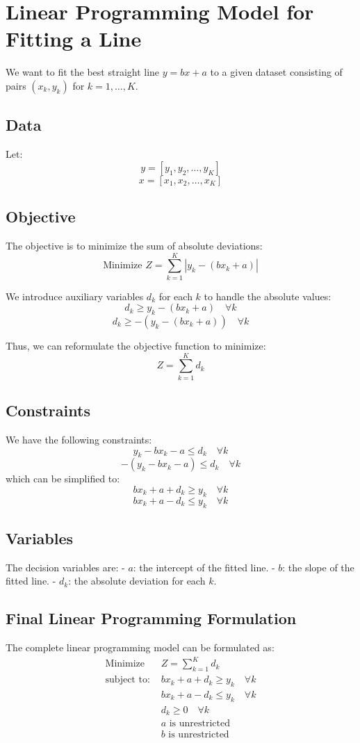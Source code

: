 \documentclass{article}
\begin{document}
\section*{Linear Programming Model for Fitting a Line}

We want to fit the best straight line \( y = bx + a \) to a given dataset consisting of pairs \( (x_k, y_k) \) for \( k = 1, \ldots, K \).

\subsection*{Data}
Let:
\[
y = [y_{1}, y_{2}, \ldots, y_{K}]
\]
\[
x = [x_{1}, x_{2}, \ldots, x_{K}]
\]

\subsection*{Objective}
The objective is to minimize the sum of absolute deviations:
\[
\text{Minimize } Z = \sum_{k=1}^{K} |y_{k} - (bx_{k} + a)|
\]

We introduce auxiliary variables \( d_k \) for each \( k \) to handle the absolute values:
\[
d_k \geq y_{k} - (bx_{k} + a) \quad \forall k
\]
\[
d_k \geq -(y_{k} - (bx_{k} + a)) \quad \forall k
\]

Thus, we can reformulate the objective function to minimize:
\[
Z = \sum_{k=1}^{K} d_k
\]

\subsection*{Constraints}
We have the following constraints:
\[
y_k - bx_k - a \leq d_k \quad \forall k
\]
\[
-(y_k - bx_k - a) \leq d_k \quad \forall k
\]
which can be simplified to:
\[
bx_k + a + d_k \geq y_k \quad \forall k
\]
\[
bx_k + a - d_k \leq y_k \quad \forall k
\]

\subsection*{Variables}
The decision variables are:
- \( a \): the intercept of the fitted line.
- \( b \): the slope of the fitted line.
- \( d_k \): the absolute deviation for each \( k \).

\subsection*{Final Linear Programming Formulation}
The complete linear programming model can be formulated as:
\[
\begin{align*}
\text{Minimize } & Z = \sum_{k=1}^{K} d_k \\
\text{subject to: } & bx_k + a + d_k \geq y_k \quad \forall k \\
& bx_k + a - d_k \leq y_k \quad \forall k \\
& d_k \geq 0 \quad \forall k \\
& a \text{ is unrestricted} \\
& b \text{ is unrestricted}
\end{align*}
\]
\end{document}

